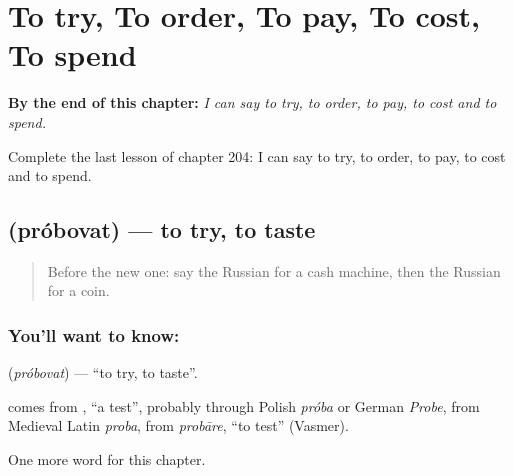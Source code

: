 
\chapter{To try, To order, To pay, To cost, To spend}
\label{ch:ru-to-try-to-order-to-pay-to-cost-to-spend}

\begin{chapteropening}
\textbf{By the end of this chapter:} \emph{I can say to try, to order, to pay, to cost and to spend.}

Complete the last lesson of chapter 204: I can say to try, to order, to pay, to cost and to spend.
\end{chapteropening}

\section[\texorpdfstring{\ru{пробовать} (próbovat)}{пробовать (próbovat)}]{ (próbovat) — to try, to taste}

\label{lesson:RU-C204-probovat}



\begin{quote}
Before the new one: say the Russian for a cash machine, then the Russian for a coin.
\end{quote}

\subsection*{You'll want to know: }
\textbf{} (\emph{próbovat}) — \textquotedblleft{}to try, to taste\textquotedblright{}.

\begin{cousinweb}
\textbf{} comes from \emph{}, \textquotedblleft{}a test\textquotedblright{}, probably through Polish \emph{próba} or German \emph{Probe}, from Medieval Latin \emph{proba}, from \emph{probāre}, \textquotedblleft{}to test\textquotedblright{} (Vasmer).
\end{cousinweb}

\begin{grammarlens}[title={What you've built}]
One more word for this chapter.
\end{grammarlens}

